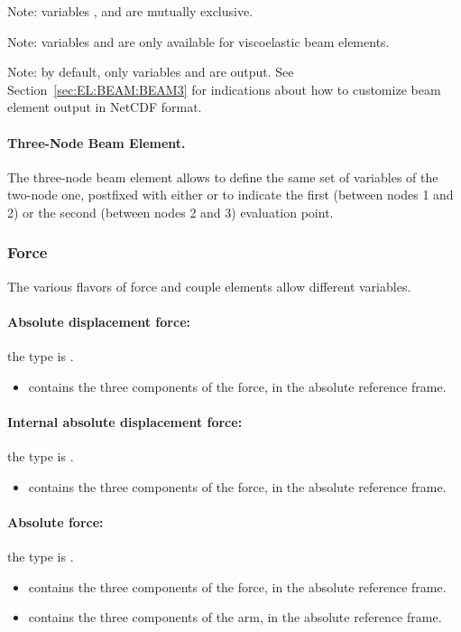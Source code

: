 Note: variables ,  and  are mutually exclusive.

Note: variables  and 
are only available for viscoelastic beam elements.

Note: by default, only variables 
and  are output.
See Section~\ref{sec:EL:BEAM:BEAM3} for indications
about how to customize beam element output in NetCDF format.

\paragraph{Three-Node Beam Element.}
The three-node beam element allows to define the same set of variables
of the two-node one, postfixed with either  or 
to indicate the first (between nodes 1 and 2)
or the second (between nodes 2 and 3)
evaluation point.




\subsubsection{Force}
\label{sec:NetCDF:Elem:Force}

The various flavors of force and couple elements allow different variables.

\paragraph{Absolute displacement force:}
the type is .
\begin{itemize}
\item {} contains the three components of the force, in the absolute reference frame.
\end{itemize}

\paragraph{Internal absolute displacement force:}
the type is .
\begin{itemize}
\item {} contains the three components of the force, in the absolute reference frame.
\end{itemize}

\paragraph{Absolute force:}
the type is .
\begin{itemize}
\item {} contains the three components of the force, in the absolute reference frame.
\item {} contains the three components of the arm, in the absolute reference frame.
\end{itemize}


